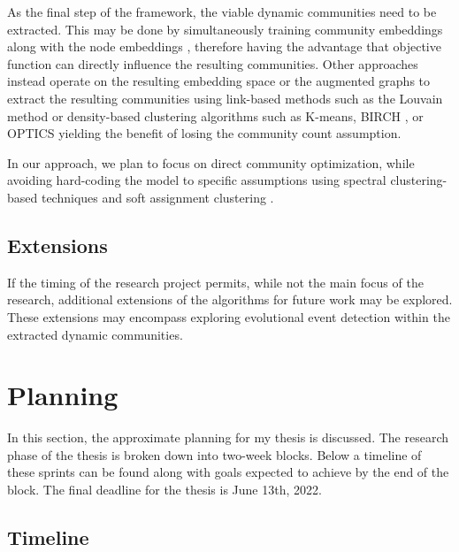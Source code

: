 \documentclass[
acmsmall,
nonacm,
screen,
acmthm]{../../scripts/pandoc/templates/acmart}
\begin{document}
As the final step of the framework, the viable dynamic communities need
to be extracted. This may be done by simultaneously training community
embeddings along with the node embeddings
\citep{maCommunityawareDynamicNetwork2020, limBlackHoleRobustCommunity2016, wangEvolutionaryAutoencoderDynamic2020},
therefore having the advantage that objective function can directly
influence the resulting communities. Other approaches instead operate on
the resulting embedding space or the augmented graphs to extract the
resulting communities using link-based methods such as the Louvain
method or density-based clustering algorithms such as K-means, BIRCH
\citep{zhangBIRCHEfficientData1996}, or OPTICS
\citep{ankerstOPTICSOrderingPoints1999} yielding the benefit of losing
the community count assumption.

In our approach, we plan to focus on direct community optimization,
while avoiding hard-coding the model to specific assumptions using
spectral clustering-based techniques and soft assignment clustering
\citep[
]{liDivideandconquerBasedLargeScale2021, maCommunityawareDynamicNetwork2020}.

\hypertarget{extensions}{%
\subsection{Extensions}\label{extensions}}

If the timing of the research project permits, while not the main focus
of the research, additional extensions of the algorithms for future work
may be explored. These extensions may encompass exploring evolutional
event detection within the extracted dynamic communities.

\hypertarget{planning}{%
\section{Planning}\label{planning}}

In this section, the approximate planning for my thesis is discussed.
The research phase of the thesis is broken down into two-week blocks.
Below a timeline of these sprints can be found along with goals expected
to achieve by the end of the block. The final deadline for the thesis is
June 13th, 2022.

\hypertarget{timeline}{%
\subsection{Timeline}\label{timeline}}
\end{document}
